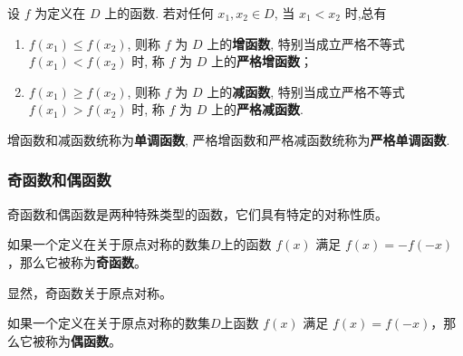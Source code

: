 \begin{definition}
    设 $f$ 为定义在 $D$ 上的函数. 若对任何 $x_1, x_2 \in D$, 当 $x_1<x_2$ 时,总有
    \begin{enumerate}
        \item $f\left(x_1\right) \leqslant f\left(x_2\right)$, 则称 $f$ 为 $D$ 上的\textcolor{third}{\bf 增函数}, 特别当成立严格不等式 $f\left(x_1\right)<f\left(x_2\right)$ 时, 称 $f$ 为 $D$ 上的\textcolor{third}{\bf 严格增函数}；
        \item $f\left(x_1\right) \geqslant f\left(x_2\right)$, 则称 $f$ 为 $D$ 上的\textcolor{third}{\bf 减函数}, 特别当成立严格不等式 $f\left(x_1\right)> f\left(x_2\right)$ 时, 称 $f$ 为 $D$ 上的\textcolor{third}{\bf 严格减函数}.
    \end{enumerate}
\end{definition}

增函数和减函数统称为\textcolor{third}{\bf 单调函数}, 严格增函数和严格减函数统称为\textcolor{third}{\bf 严格单调函数}.




\subsubsection{奇函数和偶函数}

奇函数和偶函数是两种特殊类型的函数，它们具有特定的对称性质。

\begin{definition}[奇函数]
    如果一个定义在关于原点对称的数集$D$上的函数 \( f(x) \) 满足 \( f(x) = -f(-x) \)，那么它被称为\textcolor{third}{\bf 奇函数}。
\end{definition}

显然，奇函数关于原点对称。

\begin{definition}[偶函数]
    如果一个定义在关于原点对称的数集$D$上函数 \( f(x) \) 满足 \( f(x) = f(-x) \)，那么它被称为\textcolor{third}{\bf 偶函数}。
\end{definition}

